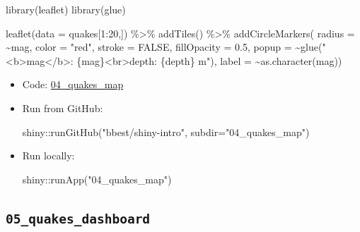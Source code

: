 \documentclass[
  letterpaper,
  DIV=11,
  numbers=noendperiod]{scrreprt}
\newenvironment{Shaded}{\begin{snugshade}}{\end{snugshade}}
\newcommand{\AttributeTok}[1]{\textcolor[rgb]{0.40,0.45,0.13}{#1}}
\newcommand{\ConstantTok}[1]{\textcolor[rgb]{0.56,0.35,0.01}{#1}}
\newcommand{\DecValTok}[1]{\textcolor[rgb]{0.68,0.00,0.00}{#1}}
\newcommand{\FloatTok}[1]{\textcolor[rgb]{0.68,0.00,0.00}{#1}}
\newcommand{\FunctionTok}[1]{\textcolor[rgb]{0.28,0.35,0.67}{#1}}
\newcommand{\NormalTok}[1]{\textcolor[rgb]{0.00,0.23,0.31}{#1}}
\newcommand{\SpecialCharTok}[1]{\textcolor[rgb]{0.37,0.37,0.37}{#1}}
\newcommand{\StringTok}[1]{\textcolor[rgb]{0.13,0.47,0.30}{#1}}
\begin{document}
\begin{Shaded}
\begin{Highlighting}[]
\FunctionTok{library}\NormalTok{(leaflet)}
\FunctionTok{library}\NormalTok{(glue)}

\FunctionTok{leaflet}\NormalTok{(}\AttributeTok{data =}\NormalTok{ quakes[}\DecValTok{1}\SpecialCharTok{:}\DecValTok{20}\NormalTok{,]) }\SpecialCharTok{\%\textgreater{}\%} 
  \FunctionTok{addTiles}\NormalTok{() }\SpecialCharTok{\%\textgreater{}\%}
  \FunctionTok{addCircleMarkers}\NormalTok{(}
    \AttributeTok{radius =} \SpecialCharTok{\textasciitilde{}}\NormalTok{mag, }\AttributeTok{color =} \StringTok{"red"}\NormalTok{, }\AttributeTok{stroke =} \ConstantTok{FALSE}\NormalTok{, }\AttributeTok{fillOpacity =} \FloatTok{0.5}\NormalTok{,}
    \AttributeTok{popup =} \SpecialCharTok{\textasciitilde{}}\FunctionTok{glue}\NormalTok{(}\StringTok{"\textless{}b\textgreater{}mag\textless{}/b\textgreater{}: \{mag\}\textless{}br\textgreater{}depth: \{depth\} m"}\NormalTok{), }\AttributeTok{label =} \SpecialCharTok{\textasciitilde{}}\FunctionTok{as.character}\NormalTok{(mag))}
\end{Highlighting}
\end{Shaded}

\begin{itemize}
\item
  Code:
  \href{https://github.com/bbest/shiny-intro/tree/master/04_quakes_map}{04\_quakes\_map}
\item
  Run from GitHub:

\begin{Shaded}
\begin{Highlighting}[]
\NormalTok{shiny}\SpecialCharTok{::}\FunctionTok{runGitHub}\NormalTok{(}\StringTok{"bbest/shiny{-}intro"}\NormalTok{, }\AttributeTok{subdir=}\StringTok{"04\_quakes\_map"}\NormalTok{)}
\end{Highlighting}
\end{Shaded}
\item
  Run locally:

\begin{Shaded}
\begin{Highlighting}[]
\NormalTok{shiny}\SpecialCharTok{::}\FunctionTok{runApp}\NormalTok{(}\StringTok{"04\_quakes\_map"}\NormalTok{)}
\end{Highlighting}
\end{Shaded}
\end{itemize}

\hypertarget{quakes_dashboard}{%
\subsection{\texorpdfstring{\texttt{05\_quakes\_dashboard}}{05\_quakes\_dashboard}}\label{quakes_dashboard}}
\end{document}
